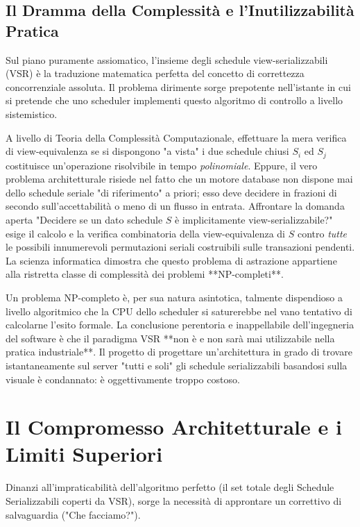 \subsection{Il Dramma della Complessità e l'Inutilizzabilità Pratica}

Sul piano puramente assiomatico, l'insieme degli schedule view-serializzabili (VSR) è la traduzione matematica perfetta del concetto di correttezza concorrenziale assoluta. Il problema dirimente sorge prepotente nell'istante in cui si pretende che uno scheduler implementi questo algoritmo di controllo a livello sistemistico.

A livello di Teoria della Complessità Computazionale, effettuare la mera verifica di view-equivalenza se si dispongono "a vista" i due schedule chiusi $S_i$ ed $S_j$ costituisce un'operazione risolvibile in tempo \textit{polinomiale}.
Eppure, il vero problema architetturale risiede nel fatto che un motore database non dispone mai dello schedule seriale "di riferimento" a priori; esso deve decidere in frazioni di secondo sull'accettabilità o meno di un flusso in entrata.
Affrontare la domanda aperta "Decidere se un dato schedule $S$ è implicitamente view-serializzabile?" esige il calcolo e la verifica combinatoria della view-equivalenza di $S$ contro \textit{tutte} le possibili innumerevoli permutazioni seriali costruibili sulle transazioni pendenti. La scienza informatica dimostra che questo problema di astrazione appartiene alla ristretta classe di complessità dei problemi **NP-completi**.

Un problema NP-completo è, per sua natura asintotica, talmente dispendioso a livello algoritmico che la CPU dello scheduler si saturerebbe nel vano tentativo di calcolarne l'esito formale.
La conclusione perentoria e inappellabile dell'ingegneria del software è che il paradigma VSR **non è e non sarà mai utilizzabile nella pratica industriale**.
Il progetto di progettare un'architettura in grado di trovare istantaneamente sul server "tutti e soli" gli schedule serializzabili basandosi sulla visuale è condannato: è oggettivamente troppo costoso.

\section{Il Compromesso Architetturale e i Limiti Superiori}

Dinanzi all'impraticabilità dell'algoritmo perfetto (il set totale degli Schedule Serializzabili coperti da VSR), sorge la necessità di approntare un correttivo di salvaguardia ("Che facciamo?").

